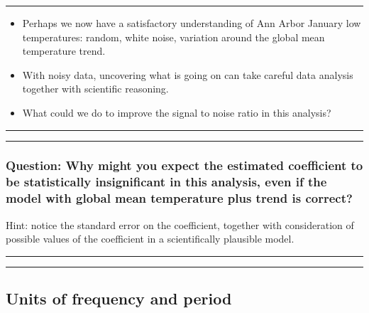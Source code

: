 \documentclass[]{article}
\begin{document}
\begin{center}\rule{0.5\linewidth}{\linethickness}\end{center}

\begin{itemize}
\item
  Perhaps we now have a satisfactory understanding of Ann Arbor January
  low temperatures: random, white noise, variation around the global
  mean temperature trend.
\item
  With noisy data, uncovering what is going on can take careful data
  analysis together with scientific reasoning.
\item
  What could we do to improve the signal to noise ratio in this
  analysis?
\end{itemize}

\begin{center}\rule{0.5\linewidth}{\linethickness}\end{center}

\begin{center}\rule{0.5\linewidth}{\linethickness}\end{center}

\subsubsection{Question: Why might you expect the estimated coefficient
to be statistically insignificant in this analysis, even if the model
with global mean temperature plus trend is
correct?}\label{question-why-might-you-expect-the-estimated-coefficient-to-be-statistically-insignificant-in-this-analysis-even-if-the-model-with-global-mean-temperature-plus-trend-is-correct}

Hint: notice the standard error on the coefficient, together with
consideration of possible values of the coefficient in a scientifically
plausible model.

\begin{center}\rule{0.5\linewidth}{\linethickness}\end{center}

\begin{center}\rule{0.5\linewidth}{\linethickness}\end{center}

\subsection{Units of frequency and
period}\label{units-of-frequency-and-period}
\end{document}
